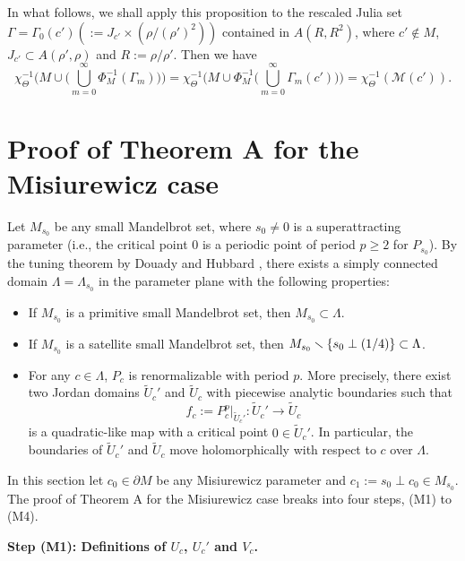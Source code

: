 \noin
In what follows, we shall apply this proposition to the rescaled Julia set 
$\Gamma = \Gamma_0(c') (:= J_{c'} \times (\rho/(\rho')^2))$ contained
in $A(R, R^2)$, where $c' \notin M$, $J_{c'} \subset A(\rho', \rho)$ 
and $R := \rho/\rho'$. Then we have
$$
\chi_\Theta^{-1}
\bigg( M \cup \Big( \bigcup_{m=0}^\infty \Phi_M^{-1}(\Gamma_m) \Big) \bigg) 
= 
\chi_\Theta^{-1}
\bigg( M \cup \Phi_M^{-1} \Big( \bigcup_{m=0}^\infty \Gamma_m(c') \Big) \bigg) 
= 
\chi_\Theta^{-1}({\mathcal M}(c')).
$$





\section{Proof of Theorem A for the Misiurewicz case}

Let $M_{s_0}$ be any small Mandelbrot set, where $s_0 \ne 0$ is a 
superattracting parameter (i.e., the critical point $0$ is a periodic 
point of period $p \geq 2$ for $P_{s_0}$).
By the tuning theorem by Douady and Hubbard 
\cite[p.42, Th\'eor\`eme 1 du Modulation]{Haissinsky 2000},
there exists a simply connected domain $\Lambda=\Lambda_{s_0}$ in 
the parameter plane  with the following properties:
\begin{itemize}
\item
If $M_{s_0}$ is a primitive small Mandelbrot set, then 
$M_{s_0}\subset \Lambda$.
\item
If $M_{s_0}$ is a satellite small Mandelbrot set,   
then $M_{s_0}\smallsetminus\{s_0 \perp (1/4)\}\subset \Lambda$.
\item
For any $c \in \Lambda$, $P_c$ is renormalizable with period $p$. 
More precisely, there exist two Jordan domains $\widetilde{U}_c'$ and $\widetilde{U}_c$ with piecewise analytic boundaries such that
$$
  f_c := P_c^p|_{\widetilde{U}_c'} : \widetilde{U}_c' \to \widetilde{U}_c
$$
is a quadratic-like map with a critical point $0 \in \widetilde{U}_c'$. 
In particular, the boundaries of $\widetilde{U}_c'$ and 
$\widetilde{U}_c$ move holomorphically with respect to $c$ over $\Lambda$.
\end{itemize}
In this section let $c_0 \in \partial M$ be any Misiurewicz parameter and $c_1 := s_0 \perp c_0 \in M_{s_0}$. 
The proof of Theorem A for the Misiurewicz case 
breaks into four steps, (M1) to (M4).


\vskip 2mm

\noin
{\bf Step (M1): Definitions of $U_c$, $U_c'$ and $V_c$.} 

